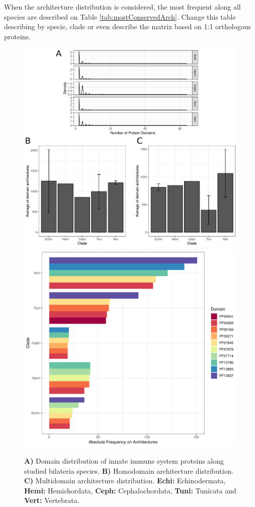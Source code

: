 \documentclass[11pt]{article}
\newcommand{\TODO}[1]{\begingroup\color{red}#1\endgroup}
\begin{document}
\TODO{When the architecture distribution is considered, the most frequent along 
all species are described on Table \ref{tab:mostConservedArch}. Change 
this table describing by specie, clade or even describe the matrix based on 1:1 
orthologous proteins.}

\begin{figure}[ht!]
\centering
\includegraphics[scale=0.53]{figures/completeDistributionDomains} \\
\includegraphics[scale=0.38]{figures/heterodomains_distr}
\caption{\textbf{A)} Domain distribution of innate immune system proteins along 
studied 
bilateria species. \textbf{B)} Homodomain architecture distribution. 
\textbf{C)} Multidomain architecture distribution. \textbf{Echi:} 
Echinodermata, \textbf{Hemi:} Hemichordata, \textbf{Ceph:} Cephalochordata, 
\textbf{Tuni:} Tunicata and \textbf{Vert:} Vertebrata.}
\label{fig:domainDistr}
\end{figure}
\end{document}
